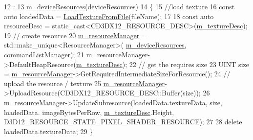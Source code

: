 \begin{DoxyCode}
12                                                                                                            
       :
13     \mbox{\hyperlink{class_texture_resource_manager_a0f99144b70c779807f6f674b1ed5b9b7}{m\_deviceResources}}(deviceResources)
14 \{
15     \textcolor{comment}{//load texture}
16     \textcolor{keyword}{const} \textcolor{keyword}{auto} loadedData = \mbox{\hyperlink{class_texture_resource_manager_ada862570ac9500e22a54662b781c9ec0}{LoadTextureFromFile}}(fileName);
17 
18     \textcolor{keyword}{const} \textcolor{keyword}{auto} resourceDesc = \textcolor{keyword}{static\_cast<}CD3DX12\_RESOURCE\_DESC\textcolor{keyword}{>}(\mbox{\hyperlink{class_texture_resource_manager_a9137a54de5e1a26cf0bb3d37b6b1af93}{m\_textureDesc}});
19     \textcolor{comment}{// create resource}
20     \mbox{\hyperlink{class_texture_resource_manager_a789f95efcad1717efd90f7e6ec1ee0ea}{m\_resourceManager}} = std::make\_unique<ResourceManager>(
      \mbox{\hyperlink{class_texture_resource_manager_a0f99144b70c779807f6f674b1ed5b9b7}{m\_deviceResources}}, commandListManager);
21     \mbox{\hyperlink{class_texture_resource_manager_a789f95efcad1717efd90f7e6ec1ee0ea}{m\_resourceManager}}->DefaultHeapResource(\mbox{\hyperlink{class_texture_resource_manager_a9137a54de5e1a26cf0bb3d37b6b1af93}{m\_textureDesc}});
22     \textcolor{comment}{// get the requires size}
23     UINT size = \mbox{\hyperlink{class_texture_resource_manager_a789f95efcad1717efd90f7e6ec1ee0ea}{m\_resourceManager}}->GetRequiredIntermediateSizeForResource();
24     \textcolor{comment}{// upload the resource / texture}
25     \mbox{\hyperlink{class_texture_resource_manager_a789f95efcad1717efd90f7e6ec1ee0ea}{m\_resourceManager}}->UploadResource(CD3DX12\_RESOURCE\_DESC::Buffer(size));
26     \mbox{\hyperlink{class_texture_resource_manager_a789f95efcad1717efd90f7e6ec1ee0ea}{m\_resourceManager}}->UpdateSubresource(loadedData.textureData, size, loadedData.
      imageBytesPerRow, \mbox{\hyperlink{class_texture_resource_manager_a9137a54de5e1a26cf0bb3d37b6b1af93}{m\_textureDesc}}.Height, D3D12\_RESOURCE\_STATE\_PIXEL\_SHADER\_RESOURCE);
27 
28     \textcolor{keyword}{delete} loadedData.textureData;
29 \}
\end{DoxyCode}
\mbox{\label{class_texture_resource_manager_ac83cdfafe8c418e18e26490b2b505ef5}} 
